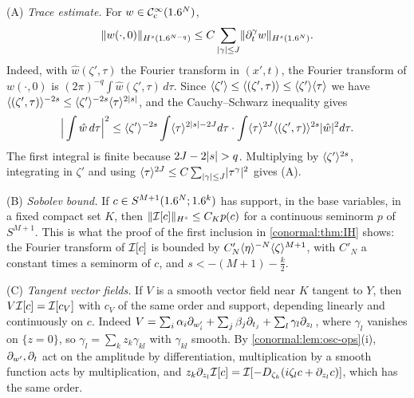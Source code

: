 (A) \emph{Trace estimate.} For $w\in\mathcal{C}^\infty_{\mathrm{c}}(1.6^N)$,
\begin{equation*}
\lVert w(\cdot,0)\rVert_{H^{s}(1.6^{N-q})}\le C\sum_{\lvert \gamma\rvert\le J}\lVert \partial_t^\gamma w\rVert_{H^{s}(1.6^N)}.
\end{equation*}
Indeed, with $\hat w(\zeta',\tau)$ the Fourier transform in $(x',t)$, the Fourier transform of
$w(\cdot,0)$ is $(2\pi)^{-q}\int\hat w(\zeta',\tau)\,d\tau$. Since
$\langle \zeta'\rangle\le\langle (\zeta',\tau)\rangle\le\langle \zeta'\rangle\langle \tau\rangle$ we have
$\langle (\zeta',\tau)\rangle^{-2s}\le\langle \zeta'\rangle^{-2s}\langle \tau\rangle^{2\lvert s\rvert}$, and the Cauchy--Schwarz
inequality gives
\begin{equation*}
\Big|\int\hat w\,d\tau\Big|^2\le\langle \zeta'\rangle^{-2s}\int\langle \tau\rangle^{2\lvert s\rvert-2J}d\tau\cdot
\int\langle \tau\rangle^{2J}\langle (\zeta',\tau)\rangle^{2s}\lvert \hat w\rvert^2d\tau .
\end{equation*}
The first integral is finite because $2J-2\lvert s\rvert>q$. Multiplying by $\langle \zeta'\rangle^{2s}$,
integrating in $\zeta'$ and using $\langle \tau\rangle^{2J}\le C\sum_{\lvert \gamma\rvert\le J}\lvert \tau^\gamma\rvert^2$
gives (A).

(B) \emph{Sobolev bound.} If $c\in S^{M+1}(1.6^N;1.6^k)$ has support, in the base variables,
in a fixed compact set $K$, then $\lVert \mathcal{I}[c]\rVert_{H^{s}}\le C_Kp(c)$ for a continuous seminorm
$p$ of $S^{M+1}$. This is what the proof of the first inclusion in \cref{conormal:thm:IH}
shows: the Fourier transform of $\mathcal{I}[c]$ is bounded by $C'_N\langle \eta\rangle^{-N}\langle \zeta\rangle^{M+1}$,
with $C'_N$ a constant times a seminorm of $c$, and $s<-(M+1)-\frac k2$.

(C) \emph{Tangent vector fields.} If $V$ is a smooth vector field near $K$ tangent to
$Y$, then $V\mathcal{I}[c]=\mathcal{I}[c_V]$ with $c_V$ of the same order and support, depending linearly
and continuously on $c$. Indeed
$V=\sum_i\alpha_i\partial_{w'_i}+\sum_j\beta_j\partial_{t_j}+\sum_l\gamma_l\partial_{z_l}$, where
$\gamma_l$ vanishes on $\{z=0\}$, so $\gamma_l=\sum_kz_k\gamma_{kl}$ with $\gamma_{kl}$
smooth. By \cref{conormal:lem:osc-ops}(i), $\partial_{w'},\partial_t$ act on the amplitude by
differentiation, multiplication by a smooth function acts by multiplication, and
$z_k\partial_{z_l}\mathcal{I}[c]=\mathcal{I}[-D_{\zeta_k}(i\zeta_lc+\partial_{z_l}c)]$, which has the same order.


